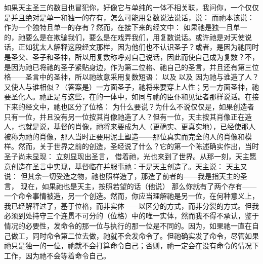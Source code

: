 如果天主圣三的数目也冒犯你，好像它与单纯的一体不相关联，我问你，一个仅仅是并且绝对是单一和独一的存有，怎么可能用复数说法说话，说： 而祂本该说： 作为一个独特且单一的存有？然而，在接下来的经文中： 如果祂是独一且单一的，祂要么是在欺骗我们，要么是在戏弄我们，用复数说话。或许祂是对天使说话，正如犹太人解释这段经文那样，因为他们也不认识圣子？或者，是因为祂同时是圣父、圣子和圣神，所以用复数称呼对自己说话，因此而使自己成为复数？不，是因为祂已将祂的圣子紧贴身边，作为第二位格、祂自己的圣言，并且还有第三位格——圣言中的圣神，所以祂故意采用复数短语： 以及 以及 因为祂与谁造了人？又使人与谁相似？（答案是）一方面圣子，祂将来要穿上人性；另一方面圣神，祂要圣化人。祂正是与这些，在的一体中，如同与祂的臣仆和见证者那样说话。在接下来的经文中，祂也区分了位格： 为什么要说？为什么不说仅仅是，如果创造者只有一位，并且没有另一位按其肖像祂造了人？但有一位，天主按其肖像正在造人，也就是说，基督的肖像，祂将来要成为人（更确实、更真实地），已经使那人被称为祂的肖像，那人当时正要用泥土塑造——那位真实而完全的人的肖像和模样。然而，关于世界之前的创造，圣经说了什么？它的第一个陈述确实作出，当时圣子尚未显现： 立刻显现出圣言， 借着祂，光也来到了世界。从那一刻，天主愿意创造在圣言中实现，基督临在并服事祂：于是天主创造了。天主说： 天主又说： 但其余一切受造之物，祂也照样造了，那造了前者的——我是指天主的圣言， 现在，如果祂也是天主，按照若望的话（他说） 那么你就有了两个存有——一个命令事情被造，另一个创造。然而，你应当理解祂是另一位，在何种意义上，我已经解释过了，基于位格，而非实体——以区分的方式，而非分裂的方式。但我必须到处持守三个连贯不可分的（位格）中的唯一实体，然而我不得不承认，鉴于情况的必要性，发命令的那一位与执行的那一位是不同的。因为，如果祂一直在自己做工，同时命令第二位去做，祂就不会发命令了。但祂确实发了命令，尽管如果祂只是独一的一位，祂就不会打算命令自己；否则，祂一定会在没有命令的情况下工作，因为祂不会等着命令自己。\par

